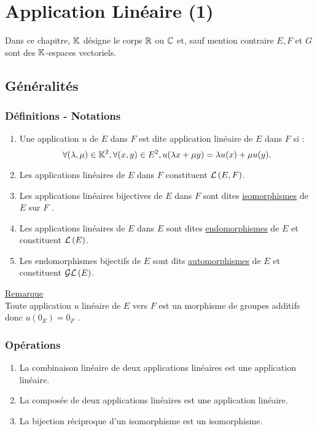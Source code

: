 \chapter{Application Linéaire (1)}

\minitoc

Dans ce chapitre, \(\mathbb{K}\) désigne le corps \(\mathbb{R}\) ou \(\mathbb{C}\) et, sauf mention contraire \(E, F\) et \(G\)  sont des \(\mathbb{K}\)-espaces vectoriels.

\section{Généralités}
\subsection{Définitions - Notations}
\begin{defi}
    \begin{enumerate}
        \item Une application \(u\) de \(E\) dans \(F\) est dite application linéaire de \(E\) dans \(F\) si :
        \[\forall (\lambda , \mu ) \in  \mathbb{K}^2, \forall (x, y) \in  E^2, u(\lambda  x + \mu y) = \lambda  u(x) + \mu u(y).\]
        \item Les applications linéaires de \(E\) dans \(F\) constituent \(\mathcal{L}\left(E,F\right)\).
        \item Les applications linéaires bijectives de \(E\) dans \(F\) sont dites \underline{isomorphismes} de \(E\) sur \(F\) .
        \item Les applications linéaires de \(E\) dans \(E\) sont dites \underline{endomorphismes} de \(E\) et constituent \(\mathcal{L}\left(E\right)\).
        \item Les endomorphismes bijectifs de \(E\) sont dits \underline{automorphismes} de \(E\) et constituent \(\mathcal{GL}\left(E\right)\).
    \end{enumerate}
    \underline{Remarque}\\
        Toute application \(u\) linéaire de \(E\) vers \(F\) est un morphisme de groupes additifs donc \(u (0_E ) = 0_F\) .
\end{defi}
\subsection{Opérations}
\begin{defprop}
    \begin{enumerate}
        \item La combinaison linéaire de deux applications linéaires est une application linéaire.
        \item La composée de deux applications linéaires est une application linéaire.
        \item La bijection réciproque d’un isomorphisme est un isomorphisme.
    \end{enumerate}
\end{defprop}
